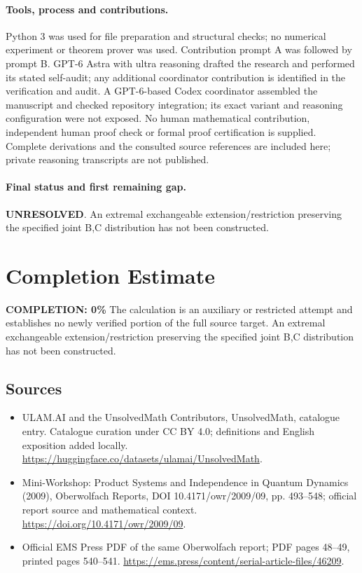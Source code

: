 \documentclass[11pt]{article}
\begin{document}
\paragraph{Tools, process and contributions.}
Python 3 was used for file preparation and structural checks; no numerical experiment or theorem prover was used. Contribution prompt A was followed by prompt B. GPT-6 Astra with ultra reasoning drafted the research and performed its stated self-audit; any additional coordinator contribution is identified in the verification and audit. A GPT-6-based Codex coordinator assembled the manuscript and checked repository integration; its exact variant and reasoning configuration were not exposed. No human mathematical contribution, independent human proof check or formal proof certification is supplied. Complete derivations and the consulted source references are included here; private reasoning transcripts are not published.

\paragraph{Final status and first remaining gap.}
\textbf{UNRESOLVED}. An extremal exchangeable extension/restriction preserving the specified joint B,C distribution has not been constructed.

\section{Completion Estimate}
\noindent\textbf{COMPLETION: 0\%}
The calculation is an auxiliary or restricted attempt and establishes no newly verified portion of the full source target. An extremal exchangeable extension/restriction preserving the specified joint B,C distribution has not been constructed.

\subsection{Sources}
\begin{itemize}
\item[\hypertarget{source:statement:1}{S1}] ULAM.AI and the UnsolvedMath Contributors, UnsolvedMath, catalogue entry. Catalogue curation under CC BY 4.0; definitions and English exposition added locally.
\url{https://huggingface.co/datasets/ulamai/UnsolvedMath}.
\item[\hypertarget{source:statement:2}{S2}] Mini-Workshop: Product Systems and Independence in Quantum Dynamics (2009), Oberwolfach Reports, DOI 10.4171/owr/2009/09, pp. 493--548; official report source and mathematical context.
\url{https://doi.org/10.4171/owr/2009/09}.
\item[\hypertarget{source:statement:3}{S3}] Official EMS Press PDF of the same Oberwolfach report; PDF pages 48--49, printed pages 540--541.
\url{https://ems.press/content/serial-article-files/46209}.
\end{itemize}
\label{end:statement}
\end{document}
